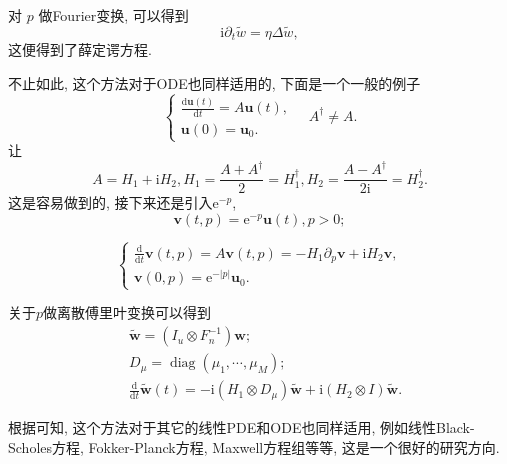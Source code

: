 对 $p$ 做Fourier变换, 可以得到
\begin{equation}
	\mathrm{i} \partial_t \tilde{w}=\eta \Delta \tilde{w}, 
\end{equation}
这便得到了薛定谔方程.

不止如此, 这个方法对于ODE也同样适用的, 下面是一个一般的例子
\begin{equation}
	\left\{\begin{array}{l}
		\frac{\mathrm{d} \boldsymbol{u}(t)}{\mathrm{d} t}=A \boldsymbol{u}(t) ,\\
		\boldsymbol{u}(0)=\boldsymbol{u}_0.
	\end{array} \quad A^{\dagger} \neq A.\right.
\end{equation}
让
\begin{equation}
	A=H_1+\mathrm{i} H_2 , H_1=\frac{A+A^{\dagger}}{2}=H_1^{\dagger},  H_2=\frac{A-A^{\dagger}}{2 \mathrm{i}}=H_2^{\dagger} .
\end{equation}
这是容易做到的, 接下来还是引入$\mathrm{e}^{-p}$, 
\begin{equation}
	\boldsymbol{v}(t, p)=\mathrm{e}^{-p} \boldsymbol{u}(t) ,  p>0;
\end{equation}

\begin{equation}
	\left\{\begin{array}{l}
		\frac{\mathrm{d}}{\mathrm{d} t} \boldsymbol{v}(t, p)=A \boldsymbol{v}(t, p)=-H_1 \partial_p \boldsymbol{v}+\mathrm{i} H_2 \boldsymbol{v} ,\\
		\boldsymbol{v}(0, p)=\mathrm{e}^{-|p|} \boldsymbol{u}_0 .
	\end{array}\right.
\end{equation}

关于$p$做离散傅里叶变换可以得到
\begin{equation}
	\begin{aligned}
		&\tilde{\boldsymbol{w}}=\left(I_u \otimes F_n^{-1}\right) \boldsymbol{w} ;\\
		&D_\mu=\operatorname{diag}\left(\mu_1, \cdots, \mu_M\right); \\
		&\frac{\mathrm{d}}{\mathrm{d} t} \tilde{\boldsymbol{w}}(t)=-\mathrm{i}\left(H_1 \otimes D_\mu\right) \tilde{\boldsymbol{w}}+\mathrm{i}\left(H_2 \otimes I\right) \tilde{\boldsymbol{w}} .
	\end{aligned}
\end{equation}

根据\cite{40}可知, 这个方法对于其它的线性PDE和ODE也同样适用, 例如线性Black-Scholes方程, Fokker-Planck方程, Maxwell方程组等等, 这是一个很好的研究方向.
